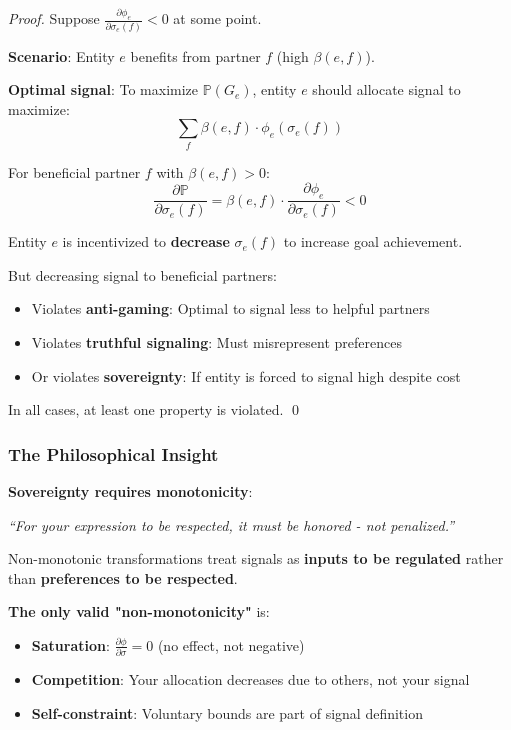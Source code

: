 \documentclass[11pt,a4paper]{article}
\theoremstyle{definition}
\theoremstyle{remark}
\begin{document}
\begin{proof}
Suppose $\frac{\partial \phi_e}{\partial \sigma_e(f)} < 0$ at some point.

\textbf{Scenario}: Entity $e$ benefits from partner $f$ (high $\beta(e,f)$).

\textbf{Optimal signal}: To maximize $\mathbb{P}(G_e)$, entity $e$ should allocate signal to maximize:
\[ \sum_f \beta(e,f) \cdot \phi_e(\sigma_e(f)) \]

For beneficial partner $f$ with $\beta(e,f) > 0$:
\[ \frac{\partial \mathbb{P}}{\partial \sigma_e(f)} = \beta(e,f) \cdot \frac{\partial \phi_e}{\partial \sigma_e(f)} < 0 \]

Entity $e$ is incentivized to \textbf{decrease} $\sigma_e(f)$ to increase goal achievement.

But decreasing signal to beneficial partners:
\begin{itemize}
\item Violates \textbf{anti-gaming}: Optimal to signal less to helpful partners
\item Violates \textbf{truthful signaling}: Must misrepresent preferences
\item Or violates \textbf{sovereignty}: If entity is forced to signal high despite cost
\end{itemize}

In all cases, at least one property is violated. \qed
\end{proof}

\subsubsection{The Philosophical Insight}

\textbf{Sovereignty requires monotonicity}:

\begin{center}
\textit{``For your expression to be respected, it must be honored - not penalized.''}
\end{center}

Non-monotonic transformations treat signals as \textbf{inputs to be regulated} rather than \textbf{preferences to be respected}.

\textbf{The only valid "non-monotonicity"} is:
\begin{itemize}
\item \textbf{Saturation}: $\frac{\partial \phi}{\partial \sigma} = 0$ (no effect, not negative)
\item \textbf{Competition}: Your allocation decreases due to others, not your signal
\item \textbf{Self-constraint}: Voluntary bounds are part of signal definition
\end{itemize}
\end{document}
